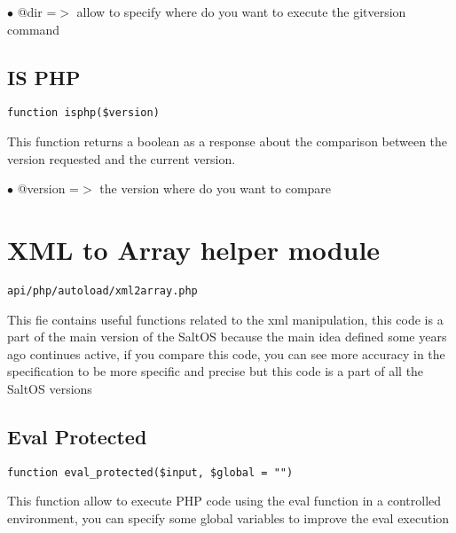 \documentclass[a4paper]{book}
\begin{document}
\begin{compactitem}
\item[\color{myblue}$\bullet$] @dir =$>$ allow to specify where do you want to execute the gitversion command
\end{compactitem}

\hypertarget{toc291}{}
\subsection{IS PHP}

\begin{lstlisting}
function isphp($version)
\end{lstlisting}

This function returns a boolean as a response about the comparison between the
version requested and the current version.

\begin{compactitem}
\item[\color{myblue}$\bullet$] @version =$>$ the version where do you want to compare
\end{compactitem}

\hypertarget{toc292}{}
\section{XML to Array helper module}

\begin{lstlisting}
api/php/autoload/xml2array.php
\end{lstlisting}

This fie contains useful functions related to the xml manipulation, this code is a part of the
main version of the SaltOS because the main idea defined some years ago continues active, if you
compare this code, you can see more accuracy in the specification to be more specific and precise
but this code is a part of all the SaltOS versions

\hypertarget{toc293}{}
\subsection{Eval Protected}

\begin{lstlisting}
function eval_protected($input, $global = "")
\end{lstlisting}

This function allow to execute PHP code using the eval function in a controlled
environment, you can specify some global variables to improve the eval execution
\end{document}
